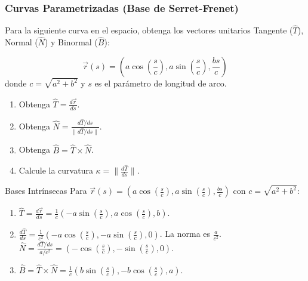 \subsubsection{Curvas Parametrizadas (Base de Serret-Frenet)}
Para la siguiente curva en el espacio, obtenga los vectores unitarios Tangente ($\hat{T}$), Normal ($\hat{N}$) y Binormal ($\hat{B}$):

$$\vec{r}(s) = \left( a \cos\left(\frac{s}{c}\right), a \sin\left(\frac{s}{c}\right), \frac{b s}{c} \right)$$ 
donde $c = \sqrt{a^2 + b^2}$ y $s$ es el parámetro de longitud de arco.

\begin{enumerate}
    \item Obtenga $\hat{T} = \frac{d\vec{r}}{ds}$.
    \item Obtenga $\hat{N} = \frac{d\hat{T}/ds}{\|d\hat{T}/ds\|}$.
    \item Obtenga $\hat{B} = \hat{T} \times \hat{N}$.
    \item Calcule la curvatura $\kappa = \|\frac{d\hat{T}}{ds}\|$.
\end{enumerate}
\begin{solucion}{Bases Intrínsecas}
Para $\vec{r}(s) = \left( a \cos(\frac{s}{c}), a \sin(\frac{s}{c}), \frac{bs}{c} \right)$ con $c = \sqrt{a^2+b^2}$:
\begin{enumerate}
    \item $\hat{T} = \frac{d\vec{r}}{ds} = \frac{1}{c} \left( -a\sin(\frac{s}{c}), a\cos(\frac{s}{c}), b \right)$.
    \item $\frac{d\hat{T}}{ds} = \frac{1}{c^2} (-a\cos(\frac{s}{c}), -a\sin(\frac{s}{c}), 0)$. La norma es $\frac{a}{c^2}$.
    $\hat{N} = \frac{d\hat{T}/ds}{a/c^2} = (-\cos(\frac{s}{c}), -\sin(\frac{s}{c}), 0)$.
    \item $\hat{B} = \hat{T} \times \hat{N} = \frac{1}{c} (b\sin(\frac{s}{c}), -b\cos(\frac{s}{c}), a)$.
\end{enumerate}
\end{solucion}
